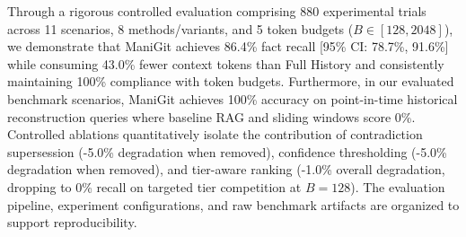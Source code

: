 Through a rigorous controlled evaluation comprising 880 experimental trials across 11 scenarios, 8 methods/variants, and 5 token budgets ($B \in [128, 2048]$), we demonstrate that ManiGit achieves 86.4\% fact recall [95\% CI: 78.7\%, 91.6\%] while consuming 43.0\% fewer context tokens than Full History and consistently maintaining 100\% compliance with token budgets. Furthermore, in our evaluated benchmark scenarios, ManiGit achieves 100\% accuracy on point-in-time historical reconstruction queries where baseline RAG and sliding windows score 0\%. Controlled ablations quantitatively isolate the contribution of contradiction supersession (-5.0\% degradation when removed), confidence thresholding (-5.0\% degradation when removed), and tier-aware ranking (-1.0\% overall degradation, dropping to 0\% recall on targeted tier competition at $B=128$). The evaluation pipeline, experiment configurations, and raw benchmark artifacts are organized to support reproducibility.

